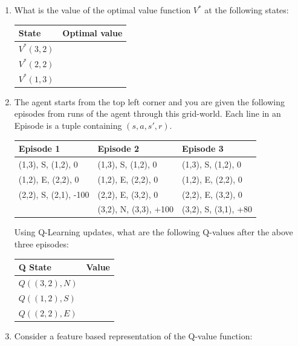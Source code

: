 \documentclass[12pt]{article}
\begin{document}
\begin{enumerate}

\item What is the value of the optimal value function $V^*$ at the following states:
  
  \begin{center}\begin{tabular}{|l|l|} \hline
  \bf State  & \bf Optimal value \\ \hline
  $V^*(3,2)$ & \\
  $V^*(2,2)$ & \\
  $V^*(1,3)$ & \\ \hline
  \end{tabular}\end{center}

\item The agent starts from the top left corner and you are given the
  following episodes from runs of the agent through this
  grid-world. Each line in an Episode is a tuple containing $(s, a,
  s', r)$.

\begin{table}[htb!]
  \centering
\begin{tabular}{l|l|l}
Episode 1 & Episode 2 & Episode 3\\
\hline
(1,3), S, (1,2), 0 & (1,3), S, (1,2), 0 & (1,3), S, (1,2), 0 \\
(1,2), E, (2,2), 0 & (1,2), E, (2,2), 0 & (1,2), E, (2,2), 0 \\
(2,2), S, (2,1), -100 & (2,2), E, (3,2), 0 & (2,2), E, (3,2), 0 \\ 
  & (3,2), N, (3,3), +100 & (3,2), S, (3,1), +80 \\ 
 \hline
\end{tabular}
\end{table}

Using Q-Learning updates, what are the following Q-values after the
above three episodes:
  
  \begin{center}\begin{tabular}{|l|l|} \hline
  \bf Q State  & \bf Value \\ \hline
  $Q((3,2),N)$ & \\
  $Q((1,2),S)$ & \\
  $Q((2,2),E)$ & \\ \hline
  \end{tabular}\end{center}

\item Consider a feature based representation of the Q-value function:


\end{enumerate}
\end{document}
